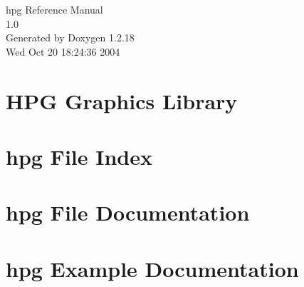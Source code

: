 \documentclass[a4paper]{book}
\begin{document}
\begin{titlepage}
\vspace*{7cm}
\begin{center}
{\Large hpg Reference Manual\\[1ex]\large 1.0}\\
\vspace*{1cm}
{\large Generated by Doxygen 1.2.18}\\
\vspace*{0.5cm}
{\small Wed Oct 20 18:24:36 2004}\\
\end{center}
\end{titlepage}
\clearemptydoublepage
{}
\tableofcontents
\clearemptydoublepage
{}
\chapter{HPG Graphics Library}
\label{index}
\chapter{hpg File Index}

\chapter{hpg File Documentation}

\chapter{hpg Example Documentation}

\printindex
\end{document}
